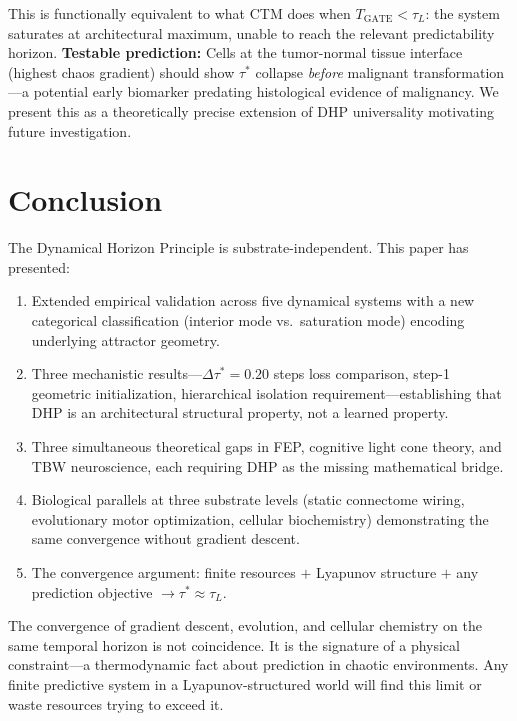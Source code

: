 \documentclass[12pt]{article}
\begin{document}
This is functionally equivalent to what CTM does when $T_{\text{GATE}} < \tau_L$: the
system saturates at architectural maximum, unable to reach the relevant predictability
horizon. \textbf{Testable prediction:} Cells at the tumor-normal tissue interface (highest
chaos gradient) should show $\tau^*$ collapse \emph{before} malignant transformation---a
potential early biomarker predating histological evidence of malignancy. We present this as
a theoretically precise extension of DHP universality motivating future investigation.

\section{Conclusion}
\label{sec:conclusion}

The Dynamical Horizon Principle is substrate-independent. This paper has presented:

\begin{enumerate}
  \item Extended empirical validation across five dynamical systems with a new categorical
        classification (interior mode vs.\ saturation mode) encoding underlying attractor
        geometry.
  \item Three mechanistic results---$\Delta\tau^*=0.20$ steps loss comparison, step-1
        geometric initialization, hierarchical isolation requirement---establishing that DHP
        is an architectural structural property, not a learned property.
  \item Three simultaneous theoretical gaps in FEP, cognitive light cone theory, and TBW
        neuroscience, each requiring DHP as the missing mathematical bridge.
  \item Biological parallels at three substrate levels (static connectome wiring, evolutionary
        motor optimization, cellular biochemistry) demonstrating the same convergence without
        gradient descent.
  \item The convergence argument: finite resources $+$ Lyapunov structure $+$ any prediction
        objective $\to \tau^* \approx \tau_L$.
\end{enumerate}

The convergence of gradient descent, evolution, and cellular chemistry on the same temporal
horizon is not coincidence. It is the signature of a physical constraint---a thermodynamic
fact about prediction in chaotic environments. Any finite predictive system in a
Lyapunov-structured world will find this limit or waste resources trying to exceed it.
\end{document}
